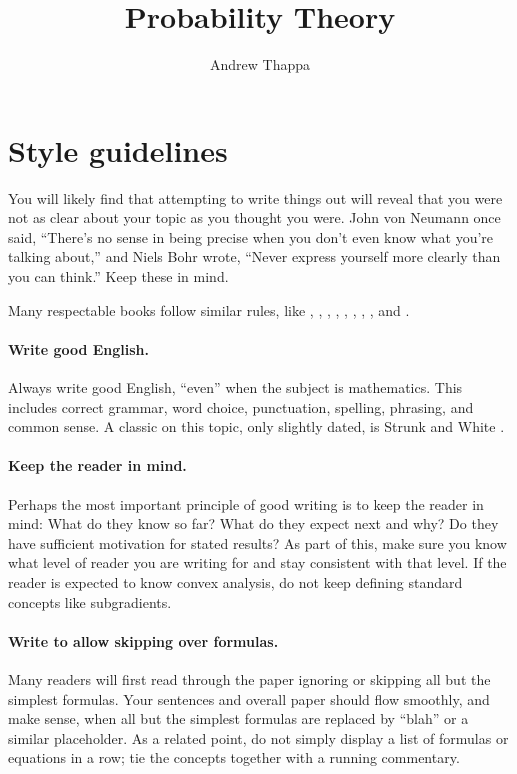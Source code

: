 \documentclass[12pt]{article}
\title{Probability Theory}
\author{Andrew Thappa}
\begin{document}


\newpage




\newpage
\section{Style guidelines}

You will likely find that attempting to write things out will reveal that you
were not as clear about your topic as you thought you were. John von
Neumann once said, ``There's no sense in being precise when you don't even know
what you're talking about,'' and Niels Bohr wrote, ``Never express yourself more
clearly than you can think.'' Keep these in mind.

Many respectable books follow similar rules, like
\cite{BoV:04},
\cite[p.~23]{Cover:1991},
\cite[p.~26]{Hastie:2001},
\cite[p.~21]{Sipser:2001},
\cite[p.~25]{Cormen:2001},
\cite[p.~15]{Rudin:1976},
\cite[p.~18]{Evans:2010},
\cite[p.~3]{Goldstein:1980}, and 
\cite{Knuth:1973}.

\paragraph{Write good English.}
Always write good English, ``even'' when the subject is mathematics. This
includes correct grammar, word choice, punctuation, spelling, phrasing,
and common sense. 
A classic on this topic, only slightly dated, 
is Strunk and White \cite{SW:59}.

\paragraph{Keep the reader in mind.} Perhaps the most important principle of
good writing is to keep the reader in mind: What do they know so far? What do
they expect next and why? Do they have sufficient motivation for stated
results? As part of this, make sure you know what level of reader you are
writing for and stay consistent with that level. If the reader is expected to
know convex analysis, do not keep defining standard concepts like subgradients.

\paragraph{Write to allow skipping over formulas.}
Many readers will first read through the paper ignoring or skipping all but the
simplest formulas. Your sentences and overall paper should flow smoothly, and
make sense, when all but the simplest formulas are replaced by ``blah'' or a
similar placeholder.  As a related point, do not simply display a list of
formulas or equations in a row; tie the concepts together with a running
commentary.
\end{document}
